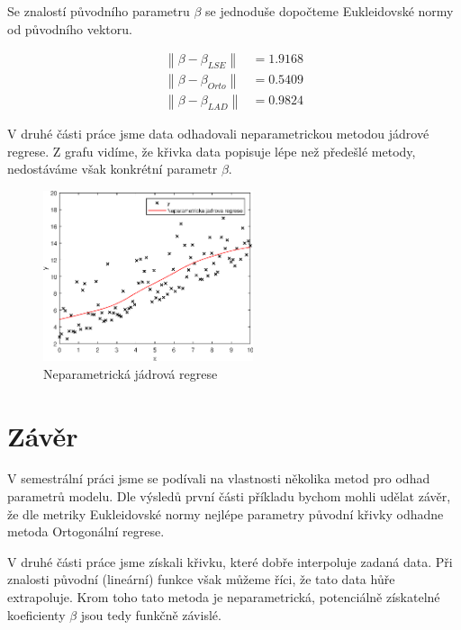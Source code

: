 Se znalostí původního parametru \( \beta \) se jednoduše dopočteme Eukleidovské normy od původního vektoru.

\begin{align*}
    \left\lVert \beta - \beta_{LSE} \right\rVert &= 1.9168 \\
    \left\lVert \beta - \beta_{Orto} \right\rVert &= 0.5409 \\
    \left\lVert \beta - \beta_{LAD} \right\rVert &= 0.9824
\end{align*}

V druhé části práce jsme data odhadovali neparametrickou metodou jádrové regrese.
Z grafu vidíme, že křivka data popisuje lépe než předešlé metody, nedostáváme však konkrétní parametr \( \beta \).

\begin{figure}[htb]
    \centering
    \includegraphics[width=0.55\textwidth]{graphs/fig2.eps}
    \caption{Neparametrická jádrová regrese}
    \label{fig:lr2}
\end{figure}
\FloatBarrier

\section{Závěr}

V semestrální práci jsme se podívali na vlastnosti několika metod pro odhad parametrů modelu.
Dle výsledů první části příkladu bychom mohli udělat závěr, že dle metriky Eukleidovské normy nejlépe parametry původní křivky odhadne metoda Ortogonální regrese.

V druhé části práce jsme získali křivku, které dobře interpoluje zadaná data.
Při znalosti původní (lineární) funkce však můžeme říci, že tato data hůře extrapoluje.
Krom toho tato metoda je neparametrická, potenciálně získatelné koeficienty \( \beta \) jsou tedy funkčně závislé.
